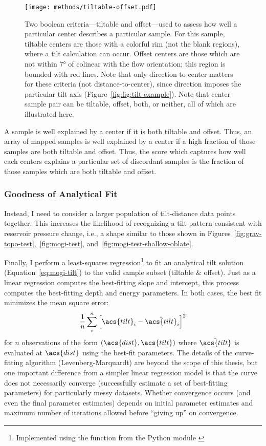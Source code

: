 \begin{figure}
    \texttt{[image: methods/tiltable-offset.pdf]}%
    \caption[Sample Criteria: Tiltable \& Offset]{Two boolean criteria---tiltable and offset---used to assess how well a particular center describes a particular sample. For this sample, tiltable centers are those with a colorful rim (not the blank regions), where a tilt calculation can occur. Offset centers are those which are not within \ang{7} of colinear with the flow orientation; this region is bounded with red lines. Note that only direction-to-center matters for these criteria (not distance-to-center), since direction imposes the particular tilt axis (Figure~\ref{fig:fig:tilt-example}). Note that center-sample pair can be tiltable, offset, both, or neither, all of which are illustrated here.}
    \label{fig:tiltable-offset}
\end{figure}

A sample is well explained by a center if it is both tiltable and offset. Thus, an array of mapped samples is well explained by a center if a high fraction of those samples are both tiltable and offset. Thus, the score which captures how well each centers explains a particular set of discordant samples is the fraction of those samples which are both tiltable and offset.

\subsubsection{Goodness of Analytical Fit}\label{sec:inflation-center}

Instead, I need to consider a larger population of tilt-distance data points together. This increases the likelihood of recognizing a tilt pattern consistent with reservoir pressure change, i.e., a shape similar to those shown in Figures~\ref{fig:grav-topo-test},~\ref{fig:mogi-test}, and~\ref{fig:mogi-test-shallow-oblate}.

Finally, I perform a least-squares regression\footnote{Implemented using the  function from the  Python module \parencite{2020SciPy-NMeth}} to fit an analytical tilt solution (Equation~\ref{eq:mogi-tilt}) to the valid sample subset (tiltable \& offset). Just as a linear regression computes the best-fitting slope and intercept, this process computes the best-fitting depth and energy parameters. In both cases, the best fit minimizes the mean square error:
\begin{equation}
    \frac{1}{n}\sum_{i}^{n}{\left[\acs{tilt}_i-\hat{\acs{tilt}}_i\right]}^2\label{eq:mse}
\end{equation}
for $n$ observations of the form $(\acs{dist}, \acs{tilt})$ where $\hat{\acs{tilt}}$ is evaluated at $\acs{dist}$ using the best-fit parameters. The details of the curve-fitting algorithm (Levenberg-Marquardt) are beyond the scope of this thesis, but one important difference from a simpler linear regression model is that the curve does not necessarily converge (successfully estimate a set of best-fitting parameters) for particularly messy datasets. Whether convergence occurs (and even the final parameter estimates) depends on initial parameter estimates and maximum number of iterations allowed before ``giving up'' on convergence.

